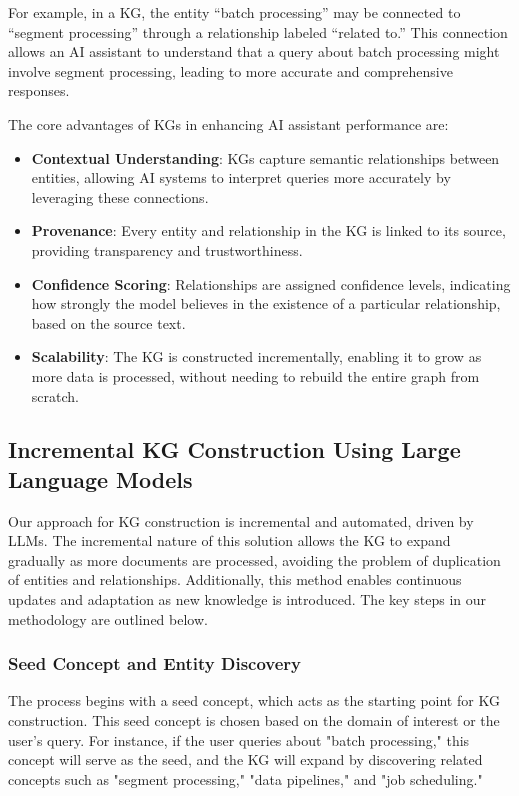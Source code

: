 For example, in a KG, the entity “batch processing” may be connected to “segment processing” through a relationship labeled “related to.” This connection allows an AI assistant to understand that a query about batch processing might involve segment processing, leading to more accurate and comprehensive responses.

The core advantages of KGs in enhancing AI assistant performance are:
\begin{itemize}
    \item \textbf{Contextual Understanding}: KGs capture semantic relationships between entities, allowing AI systems to interpret queries more accurately by leveraging these connections.
    \item \textbf{Provenance}: Every entity and relationship in the KG is linked to its source, providing transparency and trustworthiness.
    \item \textbf{Confidence Scoring}: Relationships are assigned confidence levels, indicating how strongly the model believes in the existence of a particular relationship, based on the source text.
    \item \textbf{Scalability}: The KG is constructed incrementally, enabling it to grow as more data is processed, without needing to rebuild the entire graph from scratch.
\end{itemize}

\subsection{Incremental KG Construction Using Large Language Models}

Our approach for KG construction is incremental and automated, driven by LLMs. The incremental nature of this solution allows the KG to expand gradually as more documents are processed, avoiding the problem of duplication of entities and relationships. Additionally, this method enables continuous updates and adaptation as new knowledge is introduced. The key steps in our methodology are outlined below.

\subsubsection{Seed Concept and Entity Discovery}

The process begins with a seed concept, which acts as the starting point for KG construction. This seed concept is chosen based on the domain of interest or the user's query. For instance, if the user queries about "batch processing," this concept will serve as the seed, and the KG will expand by discovering related concepts such as "segment processing," "data pipelines," and "job scheduling."

